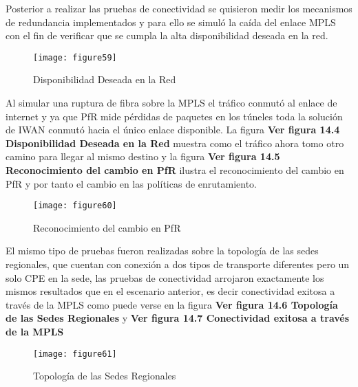 Posterior a realizar las pruebas de conectividad se quisieron medir los mecanismos de redundancia implementados y para ello se simuló la caída del enlace MPLS con el fin de verificar que se cumpla la alta disponibilidad deseada en la red.


\begin{figure}[htbp]
  \centering
    {\texttt{[image: figure59]}}%
  \caption{ Disponibilidad Deseada en la Red}
  \label{fig:fig2subfig}
\end{figure}

Al simular una ruptura de fibra sobre la MPLS el tráfico conmutó al enlace de internet y ya que PfR mide pérdidas de paquetes en los túneles toda la solución de IWAN conmutó hacia el único enlace disponible. La figura \textbf{Ver figura 14.4 Disponibilidad Deseada en la Red} muestra como el tráfico ahora tomo otro camino para llegar al mismo destino y la figura \textbf{Ver figura 14.5 Reconocimiento del cambio en PfR} ilustra el reconocimiento del cambio en PfR y por tanto el cambio en las políticas de enrutamiento.
 
 \begin{figure}[htbp]
  \centering
    {\texttt{[image: figure60]}}%
  \caption{ Reconocimiento del cambio en PfR}
  \label{fig:fig2subfig}
\end{figure}

El mismo tipo de pruebas fueron realizadas sobre la topología de las sedes regionales, que cuentan con conexión a dos tipos de transporte diferentes pero un solo CPE en la sede, las pruebas de conectividad arrojaron exactamente los mismos resultados que en el escenario anterior, es decir conectividad exitosa a través de la MPLS como puede verse en la figura \textbf{Ver figura 14.6 Topología de las Sedes Regionales} y \textbf{Ver figura 14.7 Conectividad exitosa a través de la MPLS}

\begin{figure}[htbp]
  \centering
    {\texttt{[image: figure61]}}%
  \caption{ Topología de las Sedes Regionales}
  \label{fig:fig2subfig}
\end{figure}

